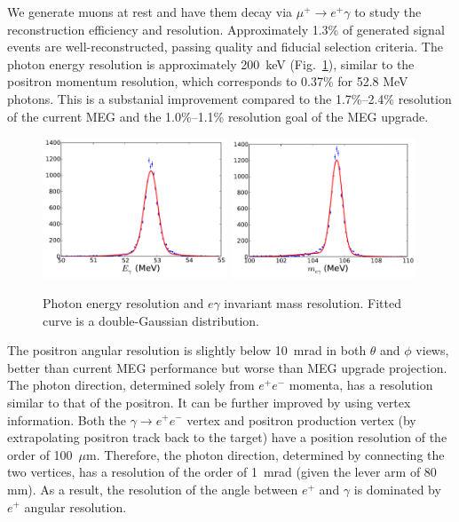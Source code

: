 We generate muons at rest and have them decay via $\mu^+\to e^+\gamma$
to study the reconstruction efficiency and resolution. 
Approximately 1.3\% of generated signal events are well-reconstructed, 
passing quality and fiducial selection criteria. The photon energy resolution 
is approximately 200~keV (Fig.~\ref{fig:eresol}), similar to the positron momentum
resolution, which 
corresponds to 0.37\% for 52.8 MeV photons. This is a substanial improvement compared 
to the 1.7\%--2.4\% resolution of the current MEG and the 1.0\%--1.1\% resolution 
goal of the MEG upgrade. 

\begin{figure}[ht]
\centering
\includegraphics[width=0.49\textwidth]{Figures/egamma-resol-fit2b.pdf}
\includegraphics[width=0.49\textwidth]{Figures/mumass-resol-fit2b.pdf}
\caption{\label{fig:eresol} Photon energy resolution and $e\gamma$ invariant
mass resolution. Fitted curve is a double-Gaussian distribution.}
\end{figure}


The positron angular resolution is slightly below 10~mrad in both $\theta$ 
and $\phi$ views,
better than current MEG performance but worse than MEG upgrade projection.
The photon direction, determined solely from $e^+e^-$ momenta, has a resolution
similar to that of the positron. It can be further improved  by using
vertex information. Both the  $\gamma\to e^+e^-$ vertex and positron production vertex
(by extrapolating positron track back to the target) have a position resolution
of the order of 100~$\mu$m. Therefore, the photon direction, determined by connecting the two
vertices, has a resolution of the order of 1~mrad (given the lever arm of 80 mm).
As a result, the resolution of the angle between $e^+$ and $\gamma$ is dominated
by $e^+$ angular resolution.

